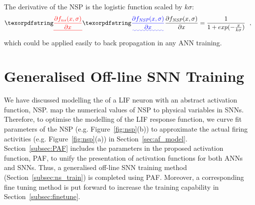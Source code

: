 	The derivative of the NSP is the logistic function scaled by $k\sigma$:
	\begin{equation}
	\DIFdelbegin \DIFdel{\frac{\partial f_{ns}(x,\sigma)}{\partial x} }\DIFdelend \DIFaddbegin \DIFadd{\frac{\partial f_{\textit{\textrm{NSP}}}(x,\sigma)}{\partial x} }\DIFaddend = \frac{1}{1+exp(-\frac{x}{k\sigma})}~~,
	\label{equ:logist}
	\end{equation}	
	which could be applied easily to back propagation in any ANN training.	

	
\section{Generalised Off-line SNN Training}
\label{sec:genrial_SNN}
	We have \DIFaddbegin {}\DIFaddend discussed modelling the \DIFdelbegin {}\DIFdelend \DIFaddbegin {}\DIFaddend of a LIF neuron with an abstract activation function, NSP.
\DIFdelbegin {}\DIFdelend %
	\DIFaddbegin {}\DIFaddend map the numerical values of NSP to physical variables in SNNs. 
	Therefore, to optimise the modelling of the LIF response function, we curve fit parameters of the NSP (e.g. Figure~\ref{fig:nsp}(b)) to approximate the actual firing activities (e.g. Figure~\ref{fig:nsp}(a)) in Section~\ref{sec:af_model}.
	Section~\ref{subsec:PAF} includes the parameters in the proposed activation function, PAF, to unify the presentation of activation functions for both ANNs and SNNs.
	Thus, a generalised off-line SNN training method (Section~\ref{subsec:ns_train}) is completed using PAF.
	Moreover, a corresponding fine tuning method is put forward to increase the training capability in Section~\ref{subsec:finetune}.
